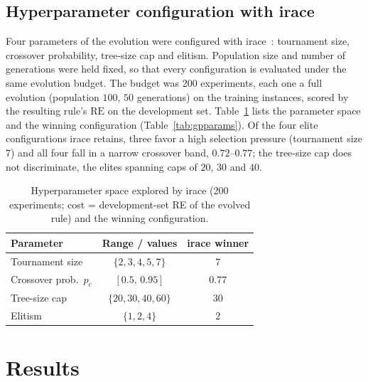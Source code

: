 \documentclass[review,authoryear,11pt]{elsarticle}
\newcommand{\RE}{\mathrm{RE}}
\begin{document}
\subsection{Hyperparameter configuration with irace}
\label{sec:irace}
Four parameters of the evolution were configured with irace~\citep{LopezIbanez2016}: tournament
size, crossover probability, tree-size cap and elitism. Population size
and number of generations were held fixed, so that every configuration is
evaluated under the same evolution budget. The budget was 200
experiments, each one a full evolution
(population $100$, $50$ generations) on the training instances, scored by
the resulting rule's $\RE$ on the development set.
Table~\ref{tab:irace} lists the parameter space and the winning
configuration (Table~\ref{tab:gpparams}). Of the four elite configurations
irace retains, three favor a high selection pressure (tournament size
$7$) and all four fall in a narrow crossover band, $0.72$--$0.77$; the
tree-size cap does not discriminate, the elites spanning caps of $20$,
$30$ and $40$.

\begin{table}[t]
\centering\small
\caption{Hyperparameter space explored by irace (200 experiments; cost =
development-set RE of the evolved rule) and the winning configuration.}
\label{tab:irace}
\begin{tabular}{lcc}
\toprule
Parameter & Range / values & irace winner \\
\midrule
Tournament size & $\{2, 3, 4, 5, 7\}$ & $7$ \\
Crossover prob.\ $p_c$ & $[0.5,\, 0.95]$ & $0.77$ \\
Tree-size cap & $\{20, 30, 40, 60\}$ & $30$ \\
Elitism & $\{1, 2, 4\}$ & $2$ \\
\bottomrule
\end{tabular}
\end{table}


\section{Results}
\label{sec:results}
\end{document}
